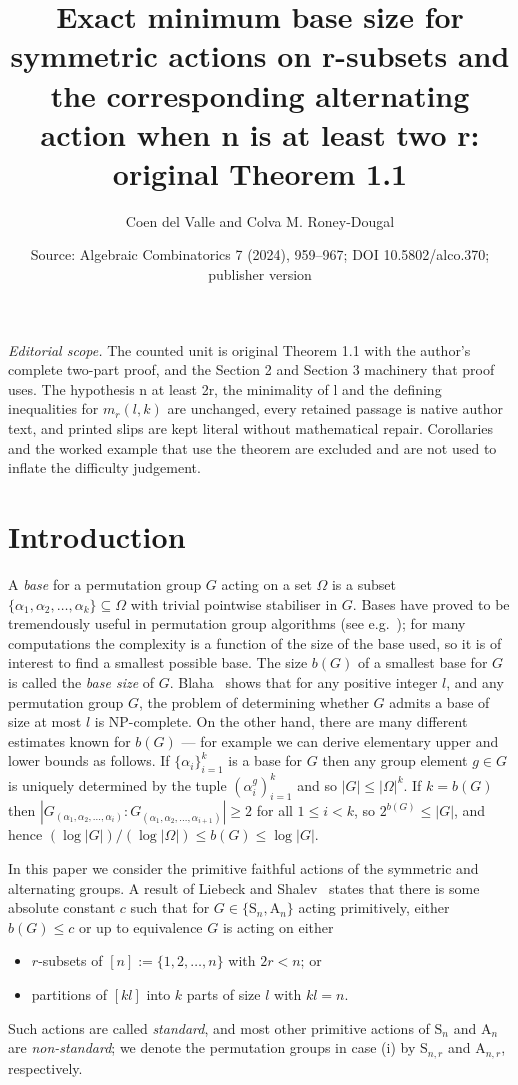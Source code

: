 \documentclass[10pt,a4paper]{amsart}
\title[Base size of the symmetric group on subsets]{Exact minimum base size for symmetric actions on r-subsets and the corresponding alternating action when n is at least two r: original Theorem 1.1}
\author{Coen del Valle and Colva M. Roney-Dougal}
\date{Source: Algebraic Combinatorics 7 (2024), 959--967; DOI 10.5802/alco.370; publisher version}
\renewcommand\S{\mathrm{S}}
\theoremstyle{plain}
\theoremstyle{definition}
\theoremstyle{remark}
\begin{document}
\maketitle
\noindent\textit{Editorial scope.} The counted unit is original Theorem 1.1 with the author's complete two-part proof, and the Section 2 and Section 3 machinery that proof uses. The hypothesis n at least 2r, the minimality of l and the defining inequalities for $m_r(l,k)$ are unchanged, every retained passage is native author text, and printed slips are kept literal without mathematical repair. Corollaries and the worked example that use the theorem are excluded and are not used to inflate the difficulty judgement.
\section{Introduction}

A \emph{base} for a permutation group $G$ acting on a set $\Omega$ is a subset $\{\alpha_1,\alpha_2,\dots, \alpha_k\}\subseteq\Omega$ with trivial pointwise stabiliser in $G$. Bases have proved to be tremendously useful in permutation group algorithms (see e.g.~\cite{ser}); for many computations the complexity is a function of the size of the base used, so it is of interest to find a smallest possible base. The size $b(G)$ of a smallest base for $G$ is called the \emph{base size} of $G$. Blaha~\cite{blaha} shows that for any positive integer $l$, and any permutation group $G$, the problem of determining whether $G$ admits a base of size at most $l$ is NP-complete. On the other hand, there are many different estimates known for $b(G)$ --- for example we can derive elementary upper and lower bounds as follows. If $\{\alpha_i\}_{i=1}^{k}$ is a base for $G$ then any group element $g\in G$ is uniquely determined by the tuple $(\alpha_i^g)_{i=1}^{k}$ and so $|G|\leq |\Omega|^{k}$. If $k=b(G)$ then $|G_{(\alpha_1,\alpha_2,\dots,\alpha_i)} : G_{(\alpha_1,\alpha_2,\dots,\alpha_{i+1})}|\geq 2$ for all $1\leq i<k$, so $2^{b(G)}\leq |G|$, and hence $(\log |G|)/(\log |\Omega|)\leq b(G)\leq \log |G|$.

In this paper we consider the primitive faithful actions of the symmetric and alternating groups. A result of Liebeck and Shalev~\cite{lie3} states that there is some absolute constant $c$ such that for $G\in\{\S_n,\mathrm{A}_n\}$ acting primitively, either $b(G)\leq c$ or up to equivalence $G$ is acting on either
\begin{itemize}
    \item[(i)] $r$-subsets of $[n]:=\{1,2,\dots, n\}$ with $2r<n$; or
    \item[(ii)] partitions of $[kl]$ into $k$ parts of size $l$ with $kl=n$.
\end{itemize}
Such actions are called \emph{standard}, and most other primitive actions of $\S_n$ and $\mathrm{A}_n$ are \emph{non-standard}; we denote the permutation groups in case (i) by $\S_{n,r}$ and $\mathrm{A}_{n,r}$, respectively.
\end{document}
